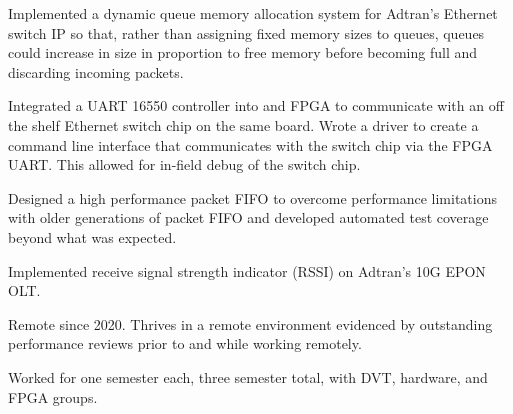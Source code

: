 \documentclass[10pt]{deedy-resume-reversed}
\begin{document}
\begin{minipage}[t]{1.0\textwidth}
\begin{tightemize}
\item Implemented a dynamic queue memory allocation system for Adtran’s Ethernet switch IP so that, rather than assigning fixed memory sizes to queues, queues could increase in size in proportion to free memory before becoming full and discarding incoming packets. 
\item Integrated a UART 16550 controller into and FPGA to communicate with an off the shelf Ethernet switch chip on the same board. Wrote a driver to create a command line interface that communicates with the switch chip via the FPGA UART. This allowed for in-field debug of the switch chip. 
\item Designed a high performance packet FIFO to overcome performance limitations with older
generations of packet FIFO and developed automated test coverage beyond what was expected.
\item Implemented receive signal strength indicator (RSSI) on Adtran’s 10G EPON OLT. 
\item Remote since 2020. Thrives in a remote environment evidenced by outstanding performance reviews prior to and while working remotely. 
\end{tightemize}
\sectionsep

\begin{tightemize}
\item Worked for one semester each, three semester total, with DVT, hardware, and FPGA groups.
\end{tightemize}
\sectionsep

\sectionsep

%
%

\end{minipage}
\hfill
\end{document}
